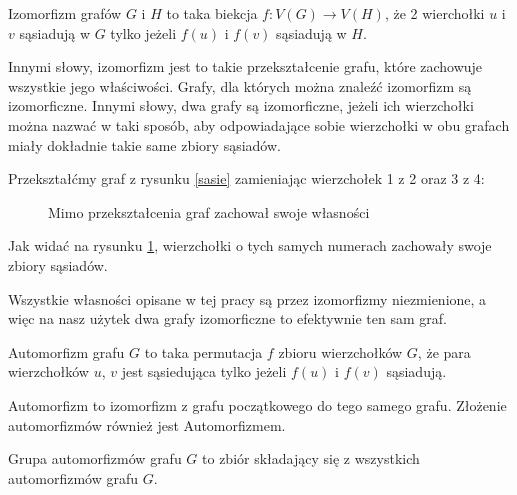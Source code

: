   \begin{definition}
    Izomorfizm grafów $G$ i $H$ to taka biekcja $f:V(G) \to V(H)$, że 2 wierchołki $u$ i $v$ sąsiadują w $G$ tylko jeżeli $f(u)$ i $f(v)$ sąsiadują w $H$.
  \end{definition}

  Innymi słowy, izomorfizm jest to takie przekształcenie grafu, które zachowuje wszystkie jego właściwości. Grafy, dla których można znaleźć izomorfizm są izomorficzne. Innymi słowy, dwa grafy są izomorficzne, jeżeli ich wierzchołki można nazwać w taki sposób, 
  aby odpowiadające sobie wierzchołki w obu grafach miały dokładnie takie same zbiory sąsiadów.
  

  Przekształćmy graf z rysunku \ref{sasie} zamieniając wierzchołek 1 z 2 oraz 3 z 4:
  \begin{figure}[H]
    \centering
    \caption{Mimo przekształcenia graf zachował swoje własności}
    \label{sasieizo}
  \end{figure}

  Jak widać na rysunku \ref{sasieizo}, wierzchołki o tych samych numerach zachowały swoje zbiory sąsiadów. 

  Wszystkie własności opisane w tej pracy są przez izomorfizmy niezmienione, a więc na nasz użytek dwa grafy izomorficzne to efektywnie ten sam graf.


  \begin{definition}
    Automorfizm grafu $G$ to taka permutacja $f$ zbioru wierzchołków $G$, że para wierzchołków $u$, $v$ jest sąsiedująca tylko jeżeli $f(u)$ i $f(v)$ sąsiadują. 
  \end{definition}
  Automorfizm to izomorfizm z grafu początkowego do tego samego grafu. 
  Złożenie automorfizmów również jest Automorfizmem.  

  \begin{definition}
    Grupa automorfizmów grafu $G$ to zbiór składający się z wszystkich automorfizmów grafu $G$.
  \end{definition}

